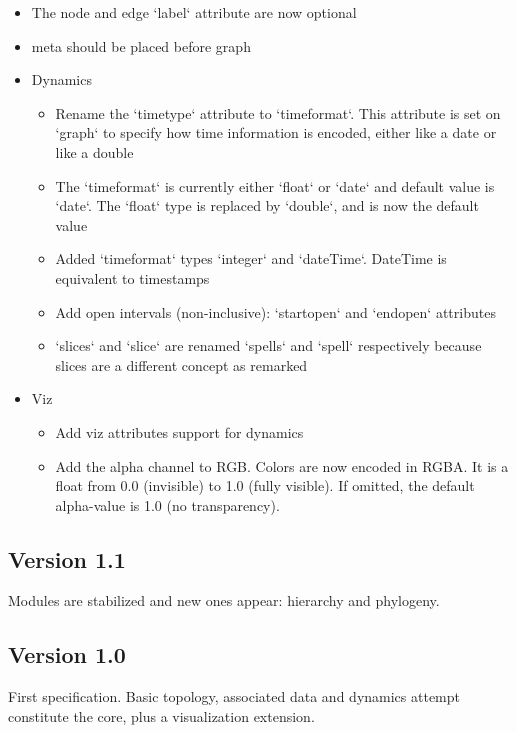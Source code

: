 \documentclass[a4paper,10pt]{article}
\begin{document}
\begin{itemize}
\item The node and edge `label` attribute are now optional
\item \<meta\> should be placed before \<graph\>
\item Dynamics
\begin{itemize}
\item Rename the `timetype` attribute to `timeformat`. This attribute is set on `\<graph\>` to specify how time information is encoded, either like a date or like a double
\item The `timeformat` is currently either `float` or `date` and default value is `date`. The `float` type is replaced by `double`, and is now the default value
\item Added `timeformat` types `integer` and `dateTime`. DateTime is equivalent to timestamps
\item Add open intervals (non-inclusive): `startopen` and `endopen` attributes
\item `\<slices\>` and `\<slice\>` are renamed `\<spells\>` and `\<spell\>` respectively because slices are a different concept as remarked
\end{itemize}
\item Viz
\begin{itemize}
\item Add viz attributes support for dynamics
\item Add the alpha channel to RGB. Colors are now encoded in RGBA. It is a float from 0.0 (invisible) to 1.0 (fully visible). If omitted, the default alpha-value is 1.0 (no transparency).
\end{itemize}
\end{itemize}

\subsection{Version 1.1}

Modules are stabilized and new ones appear: hierarchy and phylogeny.

\subsection{Version 1.0}

First specification. Basic topology, associated data and dynamics attempt constitute the core, plus a visualization extension.

\printindex
\end{document}
